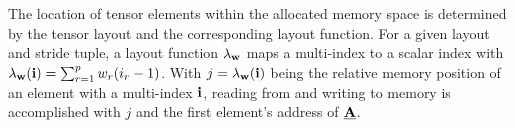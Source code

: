The location of tensor elements within the allocated memory space is determined by the tensor layout and the corresponding layout function.
For a given layout and stride tuple, a layout function $\lambda_{\mathbf{w}}$ maps a multi-index to a scalar index with $\lambda_{\mathbf{w}}(\mathbf{i}) = \sum_{r=1}^p w_r (i_r-1)$.
With $j = \lambda_{\mathbf{w}} (\mathbf{i})$ being the relative memory position of an element with a multi-index $\mathbf{i}$, reading from and writing to memory is accomplished with $j$ and the first element's address of $\underline{\mathbf{A}}$.




%



